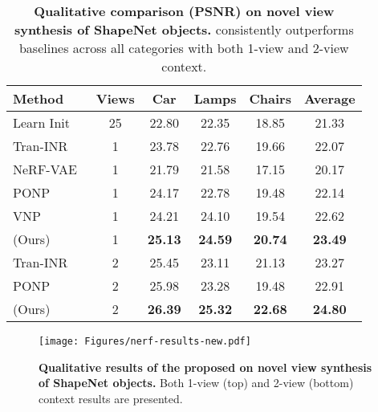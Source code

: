\begin{table*}[t]
    \centering
    \caption{\textbf{Qualitative comparison (PSNR) on novel view synthesis of ShapeNet objects.} \method{} consistently outperforms baselines across all categories with both 1-view and 2-view context.}
    \begin{tabular}{lccccc}
        \toprule
        Method & Views & Car & Lamps & Chairs & Average \\
        \midrule
        Learn Init~\citep{tancik2021learned}  & 25 & 22.80 & 22.35 & 18.85 & 21.33 \\
        \midrule
        Tran-INR~\citep{chen2022transformers}  & 1 & 23.78 & 22.76 & 19.66 & 22.07 \\
        NeRF-VAE~\citep{kosiorek2021nerf}  & 1 & 21.79 & 21.58 & 17.15 & 20.17 \\
        PONP~\citep{gu2023generalizable}  & 1 & 24.17 & 22.78 & 19.48 & 22.14 \\
        VNP~\citep{guo2023versatile}  & 1 & 24.21 & 24.10 & 19.54 & 22.62 \\
        \rowcolor{lightblue}
        \textbf{\method{}} (Ours) & 1 & \textbf{25.13} & \textbf{24.59} & \textbf{20.74} & \textbf{23.49} \\
        \midrule
        Tran-INR~\citep{chen2022transformers}  & 2 & 25.45 & 23.11 & 21.13 & 23.27 \\
        PONP~\citep{gu2023generalizable}  & 2 & 25.98 & 23.28 & 19.48 & 22.91 \\
        \rowcolor{lightblue}
        \textbf{\method{}} (Ours) & 2 & \textbf{26.39} & \textbf{25.32} & \textbf{22.68} & \textbf{24.80} \\
        \bottomrule
    \end{tabular}
    \label{tab:nerf-psnr}
    \vspace{-2mm}
\end{table*}

\begin{figure*}[t]
  \centering
  \texttt{[image: Figures/nerf-results-new.pdf]} %
  \vspace{-6mm}  \caption{\textbf{Qualitative results of the proposed \method{} on novel view synthesis of ShapeNet objects.} Both 1-view (top) and 2-view (bottom) context results are presented.} %
  \label{fig:nerf-visualization}
  \vspace{-3mm}
\end{figure*}

